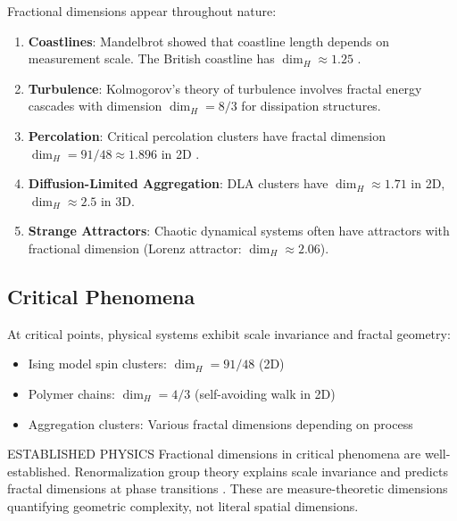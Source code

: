 Fractional dimensions appear throughout nature:

\begin{enumerate}
    \item \textbf{Coastlines}: Mandelbrot showed that coastline length depends on measurement scale. The British coastline has $\dim_H \approx 1.25$ \cite{mandelbrot1967long}.

    \item \textbf{Turbulence}: Kolmogorov's theory of turbulence involves fractal energy cascades with dimension $\dim_H = 8/3$ for dissipation structures.

    \item \textbf{Percolation}: Critical percolation clusters have fractal dimension $\dim_H = 91/48 \approx 1.896$ in 2D \cite{stauffer1994percolation}.

    \item \textbf{Diffusion-Limited Aggregation}: DLA clusters have $\dim_H \approx 1.71$ in 2D, $\dim_H \approx 2.5$ in 3D.

    \item \textbf{Strange Attractors}: Chaotic dynamical systems often have attractors with fractional dimension (Lorenz attractor: $\dim_H \approx 2.06$).
\end{enumerate}

\subsection{Critical Phenomena}

\begin{theorem}
At critical points, physical systems exhibit scale invariance and fractal geometry:
\begin{itemize}
    \item Ising model spin clusters: $\dim_H = 91/48$ (2D)
    \item Polymer chains: $\dim_H = 4/3$ (self-avoiding walk in 2D)
    \item Aggregation clusters: Various fractal dimensions depending on process
\end{itemize}
\end{theorem}

\begin{factcheck}{ESTABLISHED PHYSICS}
Fractional dimensions in critical phenomena are well-established. Renormalization group theory explains scale invariance and predicts fractal dimensions at phase transitions \cite{wilson1974renormalization}. These are measure-theoretic dimensions quantifying geometric complexity, not literal spatial dimensions.
\end{factcheck}

